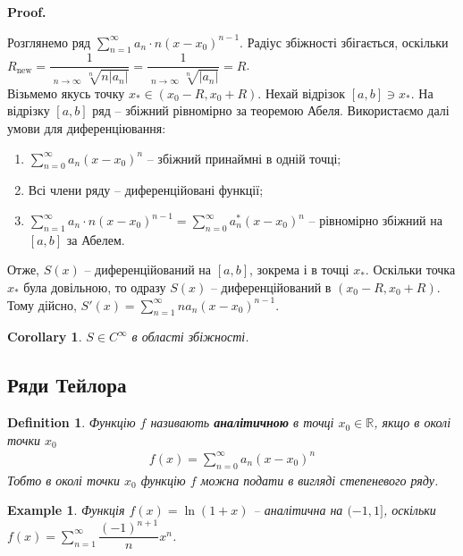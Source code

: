 \documentclass[a4paper, 10pt]{article}
\makeatletter
\DeclareMathOperator*\uplim{\overline{lim}}
\def\huge{\displaystyle}
\def\qed{$\blacksquare$}
\theoremstyle{theoremdd}
\theoremstyle{theoremdd}
\theoremstyle{theoremdd}
\newtheorem{definition}[theorem]{Definition}
\theoremstyle{theoremdd}
\theoremstyle{theoremdd}
\newtheorem{example}[theorem]{Example}
\theoremstyle{theoremdd}
\theoremstyle{theoremdd}
\theoremstyle{theoremdd}
\theoremstyle{theoremdd}
\newtheorem{corollary}[theorem]{Corollary}
\renewenvironment{proof}[1][Proof.\\]{\par
\pushQED{\hfill \qed}%
\normalfont \topsep6\p@\@plus6\p@\relax
\trivlist
\item\relax
{\bfseries
#1\@addpunct{.}}\hspace\labelsep\ignorespaces
}{%
\popQED\endtrivlist\@endpefalse
}
\makeatother
\begin{document}
\begin{proof}
Розглянемо ряд $\huge \sum_{n=1}^\infty a_n\cdot n(x-x_0)^{n-1}$. Радіус збіжності збігається, оскільки\\
$ R_{\text{new}} = \dfrac{1}{\huge \uplim_{n \to \infty} \sqrt[n]{n |a_n|}} = \dfrac{1}{\huge \uplim_{n \to \infty} \sqrt[n]{|a_n|}} = R$.\\
Візьмемо якусь точку $x_* \in (x_0-R,x_0+R)$. Нехай відрізок $[a,b] \ni x_*$. На відрізку $[a,b]$ ряд -- збіжний рівномірно за теоремою Абеля. Використаємо далі умови для диференціювання:
\begin{enumerate}[nosep,wide=0pt,label={\arabic*)}]
\item $\huge \sum_{n=0}^\infty a_n(x-x_0)^n$ -- збіжний принаймні в одній точці;\\
\item Всі члени ряду -- диференційовані функції;\\
\item $\huge \sum_{n=1}^\infty a_n \cdot n(x-x_0)^{n-1} = \huge\sum_{n=0}^\infty a_n^* (x-x_0)^n$ -- рівномірно збіжний на $[a,b]$ за Абелем.
\end{enumerate}
Отже, $S(x)$ -- диференційований на $[a,b]$, зокрема і в точці $x_*$. Оскільки точка $x_*$ була довільною, то одразу $S(x)$ -- диференційований в $(x_0-R,x_0+R)$.\\
Тому дійсно, $S'(x) = \huge \sum_{n=1}^\infty n a_n (x-x_0)^{n-1}$.
\end{proof}

\begin{corollary}
$S \in C^{\infty}$ в області збіжності.
\end{corollary}

\subsection{Ряди Тейлора}
\begin{definition}
Функцію $f$ називають \textbf{аналітичною} в точці $x_0 \in \mathbb{R}$, якщо в околі точки $x_0$
\begin{align*}
f(x) = \huge\sum_{n=0}^\infty a_n(x-x_0)^n
\end{align*}
Тобто в околі точки $x_0$ функцію $f$ можна подати в вигляді степеневого ряду.
\end{definition}

\begin{example}
Функція $f(x) = \ln (1+x)$ -- аналітична на $(-1,1]$, оскільки $f(x) = \huge\sum_{n=1}^\infty \dfrac{(-1)^{n+1}}{n} x^n$.
\end{example}
\end{document}
